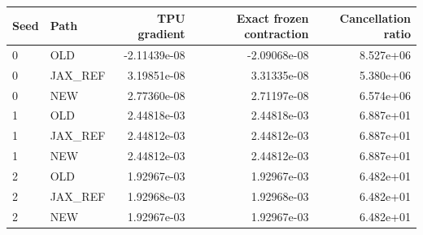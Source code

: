 \begin{tabular}{llrrr}
\hline
Seed & Path & TPU gradient & Exact frozen contraction & Cancellation ratio \\
\hline
0 & OLD & -2.11439e-08 & -2.09068e-08 & 8.527e+06 \\
0 & JAX\_REF & 3.19851e-08 & 3.31335e-08 & 5.380e+06 \\
0 & NEW & 2.77360e-08 & 2.71197e-08 & 6.574e+06 \\
1 & OLD & 2.44818e-03 & 2.44818e-03 & 6.887e+01 \\
1 & JAX\_REF & 2.44812e-03 & 2.44812e-03 & 6.887e+01 \\
1 & NEW & 2.44812e-03 & 2.44812e-03 & 6.887e+01 \\
2 & OLD & 1.92967e-03 & 1.92967e-03 & 6.482e+01 \\
2 & JAX\_REF & 1.92968e-03 & 1.92968e-03 & 6.482e+01 \\
2 & NEW & 1.92967e-03 & 1.92967e-03 & 6.482e+01 \\
\hline
\end{tabular}